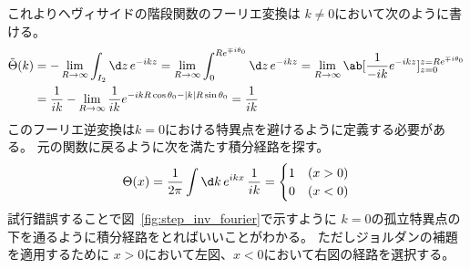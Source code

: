 これよりヘヴィサイドの階段関数のフーリエ変換は
$k\neq0$において次のように書ける。
\begin{equation}
  \begin{split}
    \tilde{\Theta}(k)
    &=-\lim_{R\rightarrow\infty}\int_{I_2}\d z\,e^{-ikz}
    =\lim_{R\rightarrow\infty}\int_0^{Re^{\mp i\theta_0}}\d z\,e^{-ikz}
    =\lim_{R\rightarrow\infty}
    \ab[\frac{1}{-ik}e^{-ikz}]_{z=0}^{z=Re^{\mp i\theta_0}} \\
    &=\frac{1}{ik}
    -\lim_{R\rightarrow\infty}\frac{1}{ik}
    e^{-ikR\cos\theta_0-|k|R\sin\theta_0}
    =\frac{1}{ik}
  \end{split}
\end{equation}
このフーリエ逆変換は$k=0$における特異点を避けるように定義する必要がある。
元の関数に戻るように次を満たす積分経路を探す。
\begin{equation}
  \Theta(x)
  =\frac{1}{2\pi}\int\d k\,e^{ikx}\,\frac{1}{ik}
  =
  \begin{cases}
    1 & (x>0) \\
    0 & (x<0) \\
  \end{cases}
\end{equation}
試行錯誤することで図~\ref{fig:step_inv_fourier}で示すように
$k=0$の孤立特異点の下を通るように積分経路をとればいいことがわかる。
ただしジョルダンの補題を適用するために
$x>0$において左図、$x<0$において右図の経路を選択する。
